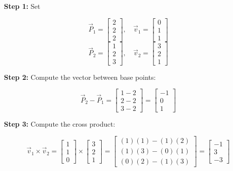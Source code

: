 \textbf{Step 1:} Set

\[
	\vec{P}_1 = \begin{bmatrix} 2 \\ 2 \\ 2 \end{bmatrix}, \quad \vec{v}_1 = \begin{bmatrix} 0 \\ 1 \\ 1 \end{bmatrix}
\]
\[
	\vec{P}_2 = \begin{bmatrix} 1 \\ 2 \\ 3 \end{bmatrix}, \quad \vec{v}_2 = \begin{bmatrix} 3 \\ 2 \\ 1 \end{bmatrix}
\]

\textbf{Step 2:} Compute the vector between base points:

\[
	\vec{P}_2 - \vec{P}_1 = \begin{bmatrix} 1 - 2 \\ 2 - 2 \\ 3 - 2 \end{bmatrix} = \begin{bmatrix} -1 \\ 0 \\ 1 \end{bmatrix}
\]

\textbf{Step 3:} Compute the cross product:

\[
	\vec{v}_1 \times \vec{v}_2 =
	\begin{bmatrix} 1 \\ 1 \\ 0 \end{bmatrix} \times \begin{bmatrix} 3 \\ 2 \\ 1 \end{bmatrix}
	= \begin{bmatrix}
		(1)(1) - (1)(2) \\
		(1)(3) - (0)(1) \\
		(0)(2) - (1)(3)
	\end{bmatrix}
	= \begin{bmatrix}
		-1 \\ 3 \\ -3
	\end{bmatrix}
\]

